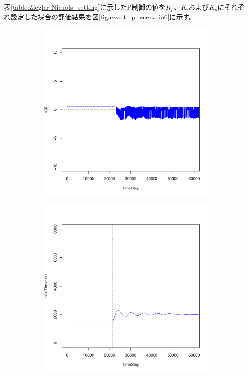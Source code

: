 \documentclass[a4j]{ujarticle}
\begin{document}
表\ref{table:Ziegler-Nichols_setting}に示したP制御の値を$K_p$、$K_i$および$K_d$にそれぞれ設定した場合の評価結果を図\ref{fig:result_p_scenario6}に示す。
\begin{figure}[htbp]
 \centering
 \begin{subfigure}{0.49\hsize}
   \centering
   \includegraphics[width=1.0\hsize]{scenario_6_e_86400_345600_1-5_0_0_0_ideal.pdf}
   \label{subfig:scenario_6_e_86400_345600_1-5_0_0_0_ideal}
 \end{subfigure}
 \begin{subfigure}{0.49\hsize}
   \centering
   \includegraphics[width=1.0\hsize]{scenario_6_idleTimer_86400_345600_1-5_0_0_0_ideal.pdf}

\end{subfigure}
\end{figure}
\end{document}
